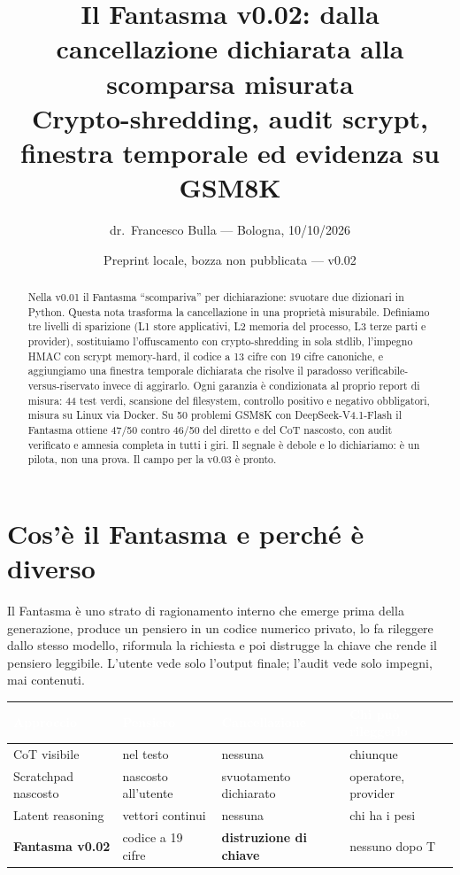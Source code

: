 \documentclass[11pt,a4paper]{article}
\title{\textcolor{ghostblue}{Il Fantasma v0.02: dalla cancellazione dichiarata alla scomparsa misurata}\\ \large Crypto-shredding, audit scrypt, finestra temporale ed evidenza su GSM8K}
\author{dr.\ Francesco Bulla --- Bologna, 10/10/2026}
\date{Preprint locale, bozza non pubblicata --- v0.02}
\begin{document}
\maketitle

\begin{abstract}
Nella v0.01 il Fantasma ``scompariva'' per dichiarazione: svuotare due dizionari
in Python. Questa nota trasforma la cancellazione in una propriet\`a misurabile.
Definiamo tre livelli di sparizione (L1 store applicativi, L2 memoria del processo,
L3 terze parti e provider), sostituiamo l'offuscamento con crypto-shredding in sola
stdlib, l'impegno HMAC con scrypt memory-hard, il codice a 13 cifre con 19 cifre
canoniche, e aggiungiamo una finestra temporale dichiarata che risolve il paradosso
verificabile-versus-riservato invece di aggirarlo. Ogni garanzia \`e condizionata al
proprio report di misura: 44 test verdi, scansione del filesystem, controllo positivo
e negativo obbligatori, misura su Linux via Docker. Su 50 problemi GSM8K con
DeepSeek-V4.1-Flash il Fantasma ottiene 47/50 contro 46/50 del diretto e del CoT
nascosto, con audit verificato e amnesia completa in tutti i giri. Il segnale \`e
debole e lo dichiariamo: \`e un pilota, non una prova. Il campo per la v0.03 \`e pronto.
\end{abstract}

\section{Cos'\`e il Fantasma e perch\'e \`e diverso}
Il Fantasma \`e uno strato di ragionamento interno che emerge prima della generazione,
produce un pensiero in un codice numerico privato, lo fa rileggere dallo stesso modello,
riformula la richiesta e poi distrugge la chiave che rende il pensiero leggibile.
L'utente vede solo l'output finale; l'audit vede solo impegni, mai contenuti.

\begin{center}
\begin{tabular}{llll}
\rowcolor{ghostblue}\textcolor{white}{Approccio} & \textcolor{white}{Pensiero} & \textcolor{white}{Cancellazione} & \textcolor{white}{Chi pu\`o rileggerlo} \\
\midrule
CoT visibile & nel testo & nessuna & chiunque \\
Scratchpad nascosto & nascosto all'utente & svuotamento dichiarato & operatore, provider \\
Latent reasoning & vettori continui & nessuna & chi ha i pesi \\
\rowcolor{palegreen}\textbf{Fantasma v0.02} & codice a 19 cifre & \textbf{distruzione di chiave} & nessuno dopo T \\
\bottomrule
\end{tabular}
\end{center}
\end{document}
